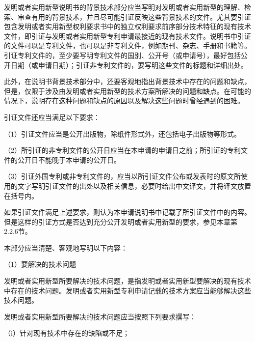 发明或者实用新型说明书的背景技术部分应当写明对发明或者实用新型的理解、检索、审查有用的背景技术，并且尽可能引证反映这些背景技术的文件。尤其要引证包含发明或者实用新型权利要求书中的独立权利要求前序部分技术特征的现有技术文件，即引证与发明或者实用新型专利申请最接近的现有技术文件。说明书中引证的文件可以是专利文件，也可以是非专利文件，例如期刊、杂志、手册和书籍等。引证专利文件的，至少要写明专利文件的国别、公开号（或申请号），最好包括公开日期（或申请日期）；引证非专利文件的，要写明这些文件的标题和详细出处。

此外，在说明书背景技术部分中，还要客观地指出背景技术中存在的问题和缺点，但是，仅限于涉及由发明或者实用新型的技术方案所解决的问题和缺点。在可能的情况下，说明存在这种问题和缺点的原因以及解决这些问题时曾经遇到的困难。

引证文件还应当满足以下要求：

{\setlength{\parindent}{17.1bp}（1）引证文件应当是公开出版物，除纸件形式外，还包括电子出版物等形式。\par}

{\setlength{\parindent}{17.1bp}（2）所引证的非专利文件的公开日应当在本申请的申请日之前；所引证的专利文件的公开日不能晚于本申请的公开日。\par}

{\setlength{\parindent}{17.1bp}（3）引证外国专利或非专利文件的，应当以所引证文件公布或发表时的原文所使用的文字写明引证文件的出处以及相关信息，必要时给出中文译文，并将译文放置在括号内。\par}

如果引证文件满足上述要求，则认为本申请说明书中记载了所引证文件中的内容。但是这样的引证方式是否达到充分公开发明或者实用新型的要求，参见本章第2.2.6节。

本部分应当清楚、客观地写明以下内容：

{\setlength{\parindent}{17.1bp}（1）要解决的技术问题\par}

发明或者实用新型所要解决的技术问题，是指发明或者实用新型要解决的现有技术中存在的技术问题。发明或者实用新型专利申请记载的技术方案应当能够解决这些技术问题。

发明或者实用新型所要解决的技术问题应当按照下列要求撰写：

{\setlength{\parindent}{17.1bp}（i）针对现有技术中存在的缺陷或不足；\par}

